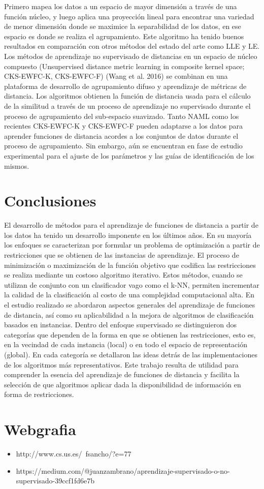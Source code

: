 \documentclass[12pt,a4paper]{report}
\begin{document}
Primero mapea los datos a un espacio de mayor dimensión a través de una función núcleo, y luego aplica una proyección lineal para encontrar una variedad de menor dimensión donde se maximice la separabilidad de los datos, en ese espacio es donde se realiza el agrupamiento. Este algoritmo ha tenido buenos resultados en comparación con otros métodos del estado del arte como LLE y LE. Los métodos de aprendizaje no supervisado de distancias en un espacio de núcleo compuesto (Unsupervised distance metric learning in composite kernel space; CKS-EWFC-K, CKS-EWFC-F) (Wang et al. 2016) se combinan en una plataforma de desarrollo de agrupamiento difuso y aprendizaje de métricas de distancia. Los algoritmos obtienen la función de distancia usada para el cálculo de la similitud a través de un proceso de aprendizaje no supervisado durante el proceso de agrupamiento del sub-espacio suavizado. Tanto NAML como los recientes CKS-EWFC-K y CKS-EWFC-F pueden adaptarse a los datos para aprender funciones de distancia acordes a los conjuntos de datos durante el proceso de agrupamiento. Sin embargo, aún se encuentran en fase de estudio experimental para el ajuste de los parámetros y las guías de identificación de los mismos.


\newpage
\section{Conclusiones}
El desarrollo de métodos para el aprendizaje de funciones de distancia a partir de los datos ha tenido un desarrollo imponente en los últimos años. En su mayoría los enfoques se caracterizan por formular un problema de optimización a partir de restricciones que se obtienen de las instancias de aprendizaje. El proceso de minimización o maximización de la función objetivo que codifica las restricciones se realiza mediante un costoso algoritmo iterativo. Estos métodos, cuando se utilizan de conjunto con un clasificador vago como el k-NN, permiten incrementar la calidad de la clasificación al costo de una complejidad computacional alta. En el estudio realizado se abordaron aspectos generales del aprendizaje de funciones de distancia, así como su aplicabilidad a la mejora de algoritmos de clasificación basados en instancias. Dentro del enfoque supervisado se distinguieron dos categorías que dependen de la forma en que se obtienen las restricciones, esto es, en la vecindad de cada instancia (local) o en todo el espacio de representación (global). En cada categoría se detallaron las ideas detrás de las implementaciones de los algoritmos más representativos. Este trabajo resulta de utilidad para comprender la esencia del aprendizaje de funciones de distancia y facilita la selección de que algoritmos aplicar dada la disponibilidad de información en forma de restricciones.

\section{Webgrafia}

\begin{itemize}
\item http://www.cs.us.es/~fsancho/?e=77
\item https://medium.com/@juanzambrano/aprendizaje-supervisado-o-no-supervisado-39ccf1fd6e7b
\end{itemize}
\end{document}
